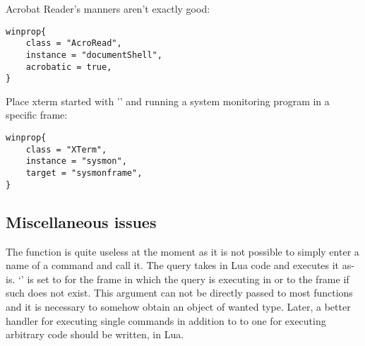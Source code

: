 Acrobat Reader's manners aren't exactly good:
\begin{verbatim}
winprop{
    class = "AcroRead",
    instance = "documentShell",
    acrobatic = true,
}
\end{verbatim}

Place xterm started with '' and running a system
monitoring program in a specific frame:
\begin{verbatim}
winprop{
    class = "XTerm",
    instance = "sysmon",
    target = "sysmonframe",
}
\end{verbatim}


\subsection{Miscellaneous issues}

The  function is quite useless at the moment as it
is not possible to simply enter a name of a command and call it.
The query takes in Lua code and executes it as-is. `' is set
to  for the frame
in which the query is executing in or to the frame if such does not exist.
This argument can not be directly passed to most functions and it is
necessary to somehow obtain an object of wanted type. Later, a better
handler for executing single commands in addition to to one for executing
arbitrary code should be written, in Lua.

